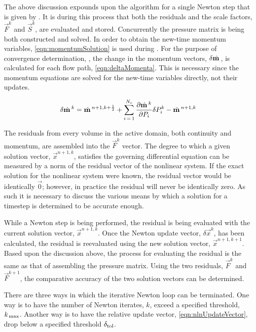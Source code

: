 The above discussion expounds upon the algorithm for a single Newton step that is given by .
It is during this process that both the residuals and the scale factors, $\vec{F}^{k}$ and $\vec{S}^{k}$, are evaluated and stored.
Concurrently the pressure matrix is being both constructed and solved.
In order to obtain the new-time momentum variables, \eqref{eqn:momentumSolution} is used during .
For the purpose of convergence determination, , the change in the momentum vectors, $\delta \momVec{}$, is calculated for each flow path, \eqref{eqn:deltaMomenta}.
This is necessary since the momentum equations are solved for the new-time variables directly, not their updates.

\begin{equation}
\label{eqn:deltaMomenta}
\delta \momVec{}^{k} = \momVec{}^{n+1,k + \onehalf} + \sum^{N_{c}}_{i\,=\,1} \frac{\partial \momVec{}^{k}}{\partial P_{i}} \delta P^{k}_{i} - \momVec{}^{n+1, k}
\end{equation}

The residuals from every volume in the active domain, both continuity and momentum, are assembled into the $\vec{F}^{k}$ vector.
The degree to which a given solution vector, $\vec{x}^{n+1, k}$, satisfies the governing differential equation can be measured by a norm of the residual vector of the nonlinear system.
If the exact solution for the nonlinear system were known, the residual vector would be identically $\vec{0}$; however, in practice the residual will never be identically zero.
As such it is necessary to discuss the various means by which a solution for a timestep is determined to be accurate enough.

While a Newton step is being performed, the residual is being evaluated with the current solution vector, $\vec{x}^{n+1,k}$.
Once the Newton update vector, $\delta \vec{x}^{k}$, has been calculated, the residual is reevaluated using the new solution vector, $\vec{x}^{n+1, k+1}$.
Based upon the discussion above, the process for evaluating the residual is the same as that of assembling the pressure matrix.
Using the two residuals, $\vec{F}^{k}$ and $\vec{F}^{k+1}$, the comparative accuracy of the two solution vectors can be determined.

There are three ways in which the iterative Newton loop can be terminated.
One way is to have the number of Newton iterates, $k$, exceed a specified threshold, $\kmax{}$.
Another way is to have the relative update vector, \eqref{eqn:nlnUpdateVector}, drop below a specified threshold $\dtol{}$.

